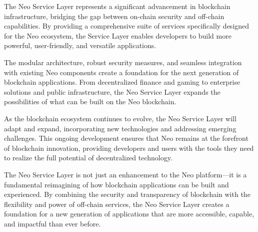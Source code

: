 The Neo Service Layer represents a significant advancement in blockchain infrastructure, bridging the gap between on-chain security and off-chain capabilities. By providing a comprehensive suite of services specifically designed for the Neo ecosystem, the Service Layer enables developers to build more powerful, user-friendly, and versatile applications.

The modular architecture, robust security measures, and seamless integration with existing Neo components create a foundation for the next generation of blockchain applications. From decentralized finance and gaming to enterprise solutions and public infrastructure, the Neo Service Layer expands the possibilities of what can be built on the Neo blockchain.

As the blockchain ecosystem continues to evolve, the Neo Service Layer will adapt and expand, incorporating new technologies and addressing emerging challenges. This ongoing development ensures that Neo remains at the forefront of blockchain innovation, providing developers and users with the tools they need to realize the full potential of decentralized technology.

The Neo Service Layer is not just an enhancement to the Neo platform—it is a fundamental reimagining of how blockchain applications can be built and experienced. By combining the security and transparency of blockchain with the flexibility and power of off-chain services, the Neo Service Layer creates a foundation for a new generation of applications that are more accessible, capable, and impactful than ever before.
